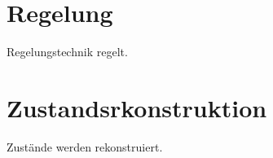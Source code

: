 \documentclass[times, 10pt,twocolumn]{article}
\begin{document}
	
	\section{Regelung}
	Regelungstechnik regelt. 
	\section{Zustandsrkonstruktion}
	Zust\"ande werden rekonstruiert.
	


\nocite{ex1, ex2}
\end{document}
